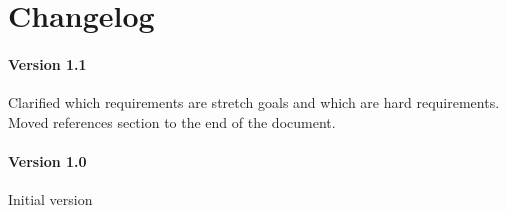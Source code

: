 \documentclass[onecolumn, draftclsnofoot,10pt, compsoc]{IEEEtran}
\begin{document}
\section{ Changelog }

\paragraph*{Version 1.1} Clarified which requirements are stretch goals and which are hard requirements. Moved references section to the end of the document.
\paragraph*{Version 1.0} Initial version





\end{document}
